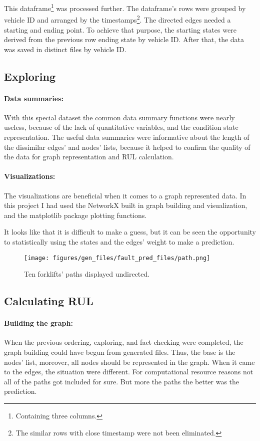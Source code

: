 This dataframe\footnote{Containing three columns.} was processed further. The dataframe's rows were grouped by vehicle ID and arranged by the timestamps\footnote{The similar rows with close timestamp were not been eliminated.}.
The directed edges needed a starting and ending point. To achieve that purpose, the starting states were derived from the previous row ending state by vehicle ID. After that, the data was saved in distinct files by vehicle ID.
	\subsection{Exploring}
		\paragraph{Data summaries:}
		With this special dataset the common data summary functions were nearly useless, because of the lack of quantitative variables, and the condition state representation.
		The useful data summaries were informative about the length of the dissimilar edges' and nodes' lists, because it helped to confirm the quality of the data for graph representation and RUL calculation. 

		\paragraph{Visualizations:}
		The visualizations are beneficial when it comes to a graph represented data. In this project I had used the NetworkX built in graph building and visualization, and the matplotlib package plotting functions.

		It looks like that it is difficult to make a guess, but it can be seen the opportunity to statistically using the states and the edges' weight to make a prediction.
			\begin{figure}[H]
			\centering
			\texttt{[image: figures/gen\_files/fault\_pred\_files/path.png]}
			\caption{Ten forklifts' paths displayed undirected.} 
			\end{figure}
	\subsection{Calculating RUL}
			\paragraph{Building the graph:}
			When the previous ordering, exploring, and fact checking were completed, the graph building could have begun from generated files. Thus, the base is the nodes' list, moreover, all nodes should be represented in the graph. When it came to the edges, the situation were different. For computational resource reasons not all of the paths got included for sure. But more the paths the better was the prediction.
